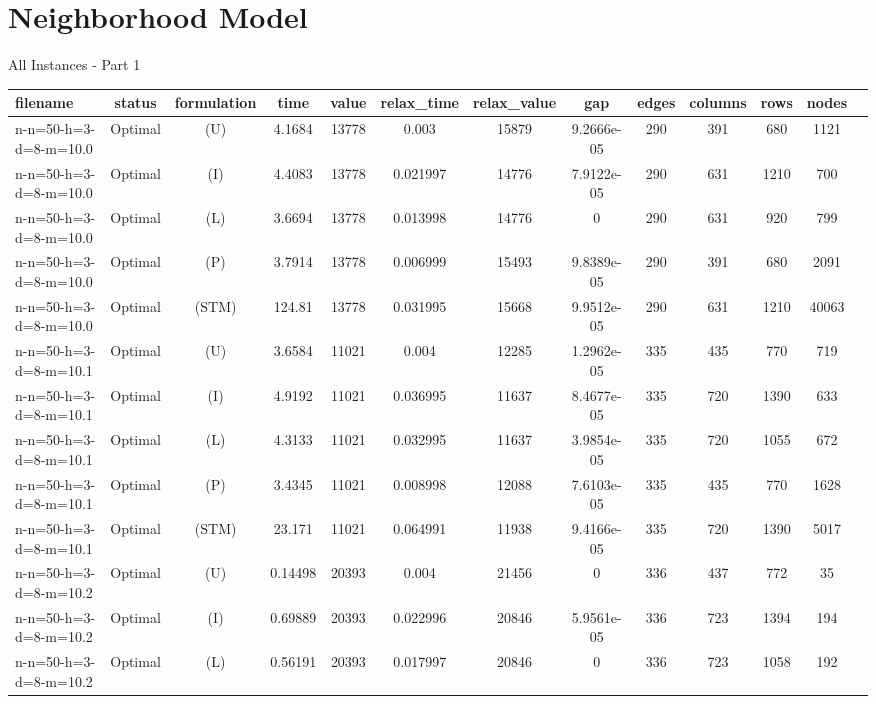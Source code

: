 \documentclass[landscape, a4paper]{article}
\newcommand{\STM}{\ensuremath{\mathrm{STM}}}
\newcommand{\Improved}{\ensuremath{\mathrm{I}}}
\newcommand{\Loose}{\ensuremath{\mathrm{L}}}
\newcommand{\Profit}{\ensuremath{\mathrm{P}}}
\newcommand{\Utility}{\ensuremath{\mathrm{U}}}
\begin{document}
\section{Neighborhood Model}
\begin{center}
All Instances - Part 1

\begin{tabular}{lcccccccccccc}
filename & status & formulation & time & value & relax\_time & relax\_value & gap & edges & columns & rows & nodes & \\
\hline
n-n=50-h=3-d=8-m=10.0 & Optimal & (\Utility) & 4.1684 & 13778 & 0.003 & 15879 & 9.2666e-05 & 290 & 391 & 680 & 1121 & \\
n-n=50-h=3-d=8-m=10.0 & Optimal & (\Improved) & 4.4083 & 13778 & 0.021997 & 14776 & 7.9122e-05 & 290 & 631 & 1210 & 700 & \\
n-n=50-h=3-d=8-m=10.0 & Optimal & (\Loose) & 3.6694 & 13778 & 0.013998 & 14776 & 0 & 290 & 631 & 920 & 799 & \\
n-n=50-h=3-d=8-m=10.0 & Optimal & (\Profit) & 3.7914 & 13778 & 0.006999 & 15493 & 9.8389e-05 & 290 & 391 & 680 & 2091 & \\
n-n=50-h=3-d=8-m=10.0 & Optimal & (\STM) & 124.81 & 13778 & 0.031995 & 15668 & 9.9512e-05 & 290 & 631 & 1210 & 40063 & \\
n-n=50-h=3-d=8-m=10.1 & Optimal & (\Utility) & 3.6584 & 11021 & 0.004 & 12285 & 1.2962e-05 & 335 & 435 & 770 & 719 & \\
n-n=50-h=3-d=8-m=10.1 & Optimal & (\Improved) & 4.9192 & 11021 & 0.036995 & 11637 & 8.4677e-05 & 335 & 720 & 1390 & 633 & \\
n-n=50-h=3-d=8-m=10.1 & Optimal & (\Loose) & 4.3133 & 11021 & 0.032995 & 11637 & 3.9854e-05 & 335 & 720 & 1055 & 672 & \\
n-n=50-h=3-d=8-m=10.1 & Optimal & (\Profit) & 3.4345 & 11021 & 0.008998 & 12088 & 7.6103e-05 & 335 & 435 & 770 & 1628 & \\
n-n=50-h=3-d=8-m=10.1 & Optimal & (\STM) & 23.171 & 11021 & 0.064991 & 11938 & 9.4166e-05 & 335 & 720 & 1390 & 5017 & \\
n-n=50-h=3-d=8-m=10.2 & Optimal & (\Utility) & 0.14498 & 20393 & 0.004 & 21456 & 0 & 336 & 437 & 772 & 35 & \\
n-n=50-h=3-d=8-m=10.2 & Optimal & (\Improved) & 0.69889 & 20393 & 0.022996 & 20846 & 5.9561e-05 & 336 & 723 & 1394 & 194 & \\
n-n=50-h=3-d=8-m=10.2 & Optimal & (\Loose) & 0.56191 & 20393 & 0.017997 & 20846 & 0 & 336 & 723 & 1058 & 192 & \\

\end{tabular}
\end{center}
\end{document}
